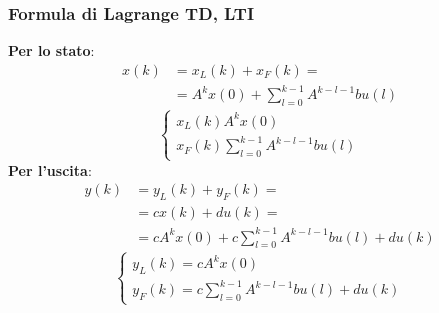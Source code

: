 \begin{landscape}
    \subsubsection*{Formula di Lagrange TD, LTI}
    \textbf{Per lo stato}:
    \[
            \begin{split}
            x(k) &= x_L(k) + x_F(k) =\\
            &=A^k x(0) + \sum_{l=0}^{k-1}A^{k-l-1}bu(l)
            \end{split}
    \]
    \[
        \begin{cases}
            x_L(k) A^k x(0)\\
            x_F(k) \sum_{l=0}^{k-1}A^{k-l-1}bu(l)
        \end{cases}
    \]
    \textbf{Per l'uscita}:
    \[
        \begin{split}
            y(k) &= y_L(k) + y_F(k) =\\
            &= cx(k)+du(k) = \\
            &=cA^k x(0) + c\sum_{l=0}^{k-1}A^{k-l-1}bu(l) + du(k)
        \end{split}
    \]
    \[
        \begin{cases}
            y_L(k) = cA^k x(0)\\
            y_F(k) = c\sum_{l=0}^{k-1}A^{k-l-1}bu(l) + du(k)
        \end{cases}
    \]

\end{landscape}
